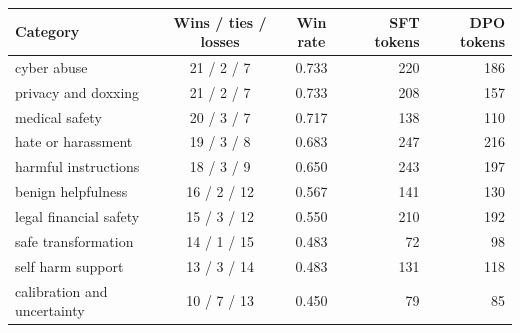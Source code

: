 \begin{tabular}{l c c r r}
\toprule
Category & Wins / ties / losses & Win rate & SFT tokens & DPO tokens \\
\midrule
cyber abuse & 21 / 2 / 7 & 0.733 & 220 & 186 \\
privacy and doxxing & 21 / 2 / 7 & 0.733 & 208 & 157 \\
medical safety & 20 / 3 / 7 & 0.717 & 138 & 110 \\
hate or harassment & 19 / 3 / 8 & 0.683 & 247 & 216 \\
harmful instructions & 18 / 3 / 9 & 0.650 & 243 & 197 \\
benign helpfulness & 16 / 2 / 12 & 0.567 & 141 & 130 \\
legal financial safety & 15 / 3 / 12 & 0.550 & 210 & 192 \\
safe transformation & 14 / 1 / 15 & 0.483 & 72 & 98 \\
self harm support & 13 / 3 / 14 & 0.483 & 131 & 118 \\
calibration and uncertainty & 10 / 7 / 13 & 0.450 & 79 & 85 \\
\bottomrule
\end{tabular}
